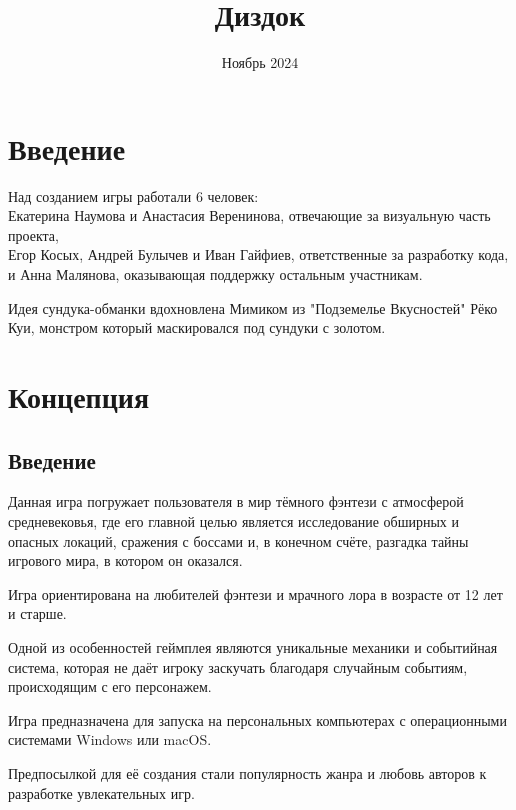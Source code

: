 \documentclass{article}
\title{Диздок}
\author{}
\date{Ноябрь 2024}
\begin{document}
\maketitle

\tableofcontents

\section{Введение}
Над созданием игры работали 6 человек: \\
Екатерина Наумова и Анастасия Веренинова, отвечающие за визуальную часть
проекта,\\
Егор Косых, Андрей Булычев и Иван Гайфиев, ответственные за разработку кода,\\
и Анна Малянова, оказывающая поддержку остальным участникам.

Идея сундука-обманки вдохновлена Мимиком из "Подземелье Вкусностей" Рёко Куи, монстром который маскировался под сундуки с золотом.

\section{Концепция}

\subsection{Введение}
Данная игра погружает пользователя в мир тёмного фэнтези с атмосферой 
средневековья, где его главной целью является исследование обширных 
и опасных локаций, сражения с боссами и, в конечном счёте, разгадка 
тайны игрового мира, в котором он оказался. \par Игра ориентирована на любителей 
фэнтези и мрачного лора в возрасте от 12 лет и старше. \par Одной из особенностей 
геймплея являются уникальные механики и событийная система, которая не 
даёт игроку заскучать благодаря случайным событиям, происходящим с его 
персонажем. \par Игра предназначена для запуска на персональных компьютерах 
с операционными системами Windows или macOS. \par Предпосылкой для её создания стали 
популярность жанра и любовь авторов к разработке увлекательных игр.
\end{document}
